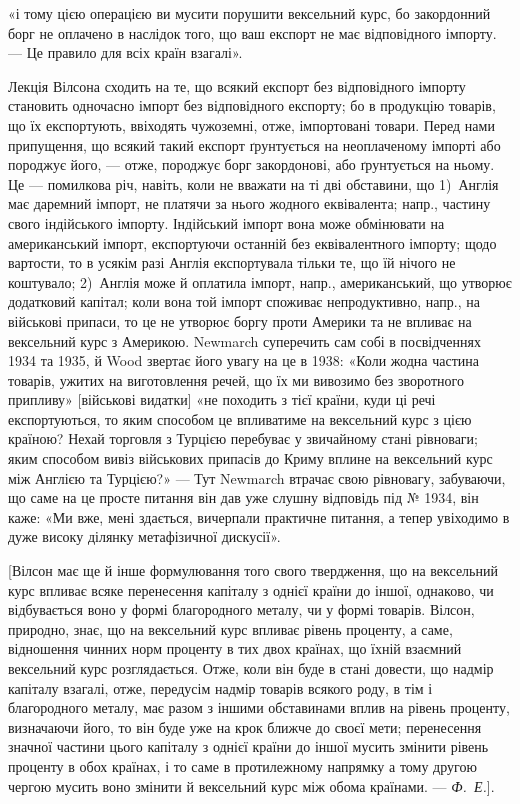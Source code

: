 \parcont{}  %
«і тому цією операцією ви мусити порушити вексельний курс, бо закордонний
борг не оплачено в наслідок того, що ваш експорт не має відповідного імпорту.
— Це правило для всіх країн взагалі».

Лекція Вілсона сходить на те, що всякий експорт без відповідного імпорту
становить одночасно імпорт без відповідного експорту; бо в продукцію товарів,
що їх експортують, ввіходять чужоземні, отже, імпортовані товари. Перед
нами припущення, що всякий такий експорт ґрунтується на неоплаченому
імпорті або породжує його, — отже, породжує борг закордонові, або ґрунтується
на ньому. Це — помилкова річ, навіть, коли не вважати на ті дві обставини,
що 1)~Англія має даремний імпорт, не платячи за нього жодного еквівалента;
напр., частину свого індійського імпорту. Індійський імпорт вона може обмінювати
на американський імпорт, експортуючи останній без еквівалентного імпорту;
щодо вартости, то в усякім разі Англія експортувала тільки те, що їй нічого
не коштувало; 2)~Англія може й оплатила імпорт, напр., американський, що
утворює додатковий капітал; коли вона той імпорт споживає непродуктивно,
напр., на військові припаси, то це не утворює боргу проти Америки та не
впливає на вексельний курс з Америкою. Newmarch суперечить сам собі в
посвідченнях 1934 та 1935, й Wood звертає його увагу на це в 1938: «Коли
жодна частина товарів, ужитих на виготовлення речей, що їх ми вивозимо без
зворотного припливу» [військові видатки] «не походить з тієї країни, куди ці
речі експортуються, то яким способом це впливатиме на вексельний курс з цією
країною? Нехай торговля з Турцією перебуває у звичайному стані рівноваги;
яким способом вивіз військових припасів до Криму вплине на вексельний курс
між Англією та Турцією?» — Тут Newmarch втрачає свою рівновагу, забуваючи,
що саме на це просте питання він дав уже слушну відповідь під № 1934, він
каже: «Ми вже, мені здається, вичерпали практичне питання, а тепер увіходимо
в дуже високу ділянку метафізичної дискусії».

[Вілсон має ще й інше формулювання того свого твердження, що на вексельний
курс впливає всяке перенесення капіталу з однієї країни до іншої, однаково,
чи відбувається воно у формі благородного металу, чи у формі товарів.
Вілсон, природно, знає, що на вексельний курс впливає рівень проценту, а
саме, відношення чинних норм проценту в тих двох країнах, що їхній взаємний
вексельний курс розглядається. Отже, коли він буде в стані довести, що надмір
капіталу взагалі, отже, передусім надмір товарів всякого роду, в тім і благородного
металу, має разом з іншими обставинами вплив на рівень проценту, визначаючи
його, то він буде уже на крок ближче до своєї мети; перенесення
значної частини цього капіталу з однієї країни до іншої мусить змінити рівень
проценту в обох країнах, і то саме в протилежному напрямку а тому другою
чергою мусить воно змінити й вексельний курс між обома країнами. — \emph{Ф.~Е.}].

